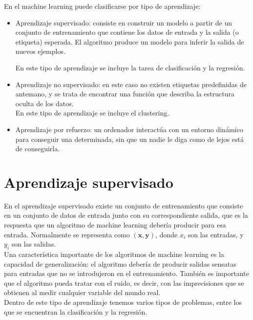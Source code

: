 En el machine learning puede clasificarse por tipo de aprendizaje:

\begin{itemize}
	\item Aprendizaje supervisado: consiste en construir un modelo a partir de un conjunto de entrenamiento que contiene los datos de entrada y la salida (o etiqueta) esperada. El algoritmo produce un modelo para inferir la salida de nuevos ejemplos.
	
	En este tipo de aprendizaje se incluye la tarea de clasificación y la regresión.
	
	\item Aprendizaje no supervisado: en este caso no existen etiquetas predefinidas de antemano, y se trata de encontrar una función que describa la estructura oculta de los datos.\\
	
	En este tipo de aprendizaje se incluye el clustering.
	
	\item Aprendizaje por refuerzo: un ordenador interactúa con un entorno dinámico para conseguir una determinada, sin que un nadie le diga como de lejos está de conseguirla.  
\end{itemize}

\section{Aprendizaje supervisado}

En el aprendizaje supervisado existe un conjunto de entrenamiento que consiste en un conjunto de datos de entrada junto con su correspondiente salida, que es la respuesta que un algoritmo de machine learning debería producir para esa entrada. Normalmente se representa como $(\mathbf{x}, \mathbf{y})$, donde $x_i$ son las entradas, y $y_i$ son las salidas.\\

Una característica importante de los algoritmos de machine learning es la capacidad de generalización: el algoritmo debería de producir salidas sensatas para entradas que no se introdujeron en el entrenamiento. También es importante que el algoritmo pueda tratar con el ruido, es decir, con las imprecisiones que se  obtienen al medir cualquier variable del mundo real.\\

Dentro de este tipo de aprendizaje tenemos varios tipos de problemas, entre los que se encuentran la clasificación y la regresión.

